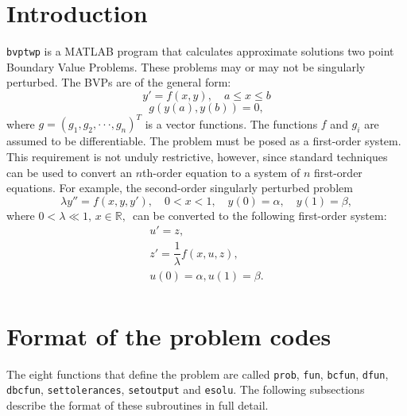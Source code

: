 \documentclass[<options>]{article}
\begin{document}
\section{Introduction}\label{intro}
\texttt{bvptwp} is a MATLAB program that calculates approximate solutions
two point Boundary Value Problems. These problems may or may not be singularly perturbed.
The BVPs are of the general form:
\begin{equation}\label{bvp1}
y'=f(x,y), \quad  a \leq  x \leq b
\end{equation}
\begin{equation}\label{bvp2}
g(y(a),y(b)) = 0,
\end{equation}
where $ g = ( g_{1}, g_{2},\cdot\cdot\cdot,g_{n})^{T}$ is a vector functions.
The functions $f$ and $g_{i}$ are assumed to be differentiable.
The problem must be posed as a first-order system. This requirement is not unduly restrictive,
however, since standard techniques can be used to convert an $n$th-order equation to a system
of $n$ first-order equations. For example, the second-order   singularly
perturbed  problem
\begin{equation}
 \lambda y''=f(x,y,y'),\quad 0 < x < 1, \quad y(0) = \alpha, \quad y(1) = \beta,
\end{equation}
where $0 <\lambda \ll 1,\, x \in \mathbb{R},\,$
can be converted to the following first-order system:
\begin{equation*}
\begin{array}{l}
u' = z, \\
z' = \dfrac{1}{\lambda}f(x,u,z), \\
 u(0) = \alpha,u(1) = \beta.\\
\end{array}
\end{equation*}

\section{Format of the problem codes}\label{Format}
The eight functions that define the problem are called \texttt{prob},
\texttt{fun}, \texttt{bcfun}, \texttt{dfun}, \texttt{dbcfun},  \texttt{settolerances},
\texttt{setoutput} and \texttt{esolu}. The following subsections describe the
format of these subroutines in full detail.
\end{document}
